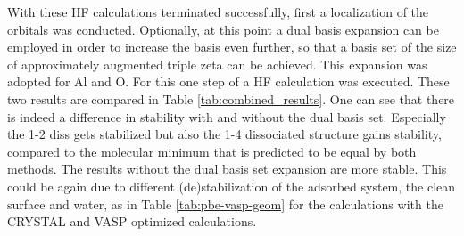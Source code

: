 \documentclass[11pt,DIV=13,BCOR=5mm,a4paper,headinclude]{scrbook}
\begin{document}
With these HF calculations terminated successfully, first a localization of the orbitals was conducted.
Optionally, at this point a dual basis expansion can be employed in order to increase the basis even further\cite{Usvyat2010}, so that a basis set of the size of approximately augmented triple zeta can be achieved.
This expansion was adopted for Al and O.
For this one step of a HF calculation was executed.
These two results are compared in Table \ref{tab:combined_results}. %
One can see that there is indeed a difference in stability with and without the dual basis set.
Especially the 1-2 diss gets stabilized but also the 1-4 dissociated structure gains stability, compared to the molecular minimum that is predicted to be equal by both methods.
The results without the dual basis set expansion are more stable.
This could be again due to different (de)stabilization of the adsorbed system, the clean surface and water, as in Table \ref{tab:pbe-vasp-geom} for the calculations with the CRYSTAL and VASP optimized calculations.
\end{document}

